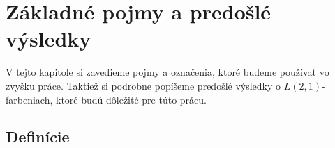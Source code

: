 \chapter{Základné pojmy a predošlé výsledky}

V tejto kapitole si zavedieme pojmy a označenia, ktoré budeme používať
vo zvyšku práce. Taktiež si podrobne popíšeme predošlé výsledky o
$L(2,1)$-farbeniach, ktoré budú dôležité pre túto prácu.

\section{Definície}
